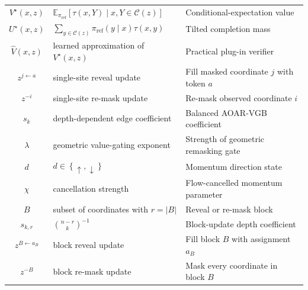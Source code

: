 \documentclass{article}
\numberwithin{theorem}{section}
\numberwithin{proposition}{section}
\numberwithin{corollary}{section}
\numberwithin{lemma}{section}
\numberwithin{conjecture}{section}
\numberwithin{remark}{section}
\numberwithin{definition}{section}
\numberwithin{assumption}{section}
\numberwithin{example}{section}
\newcommand{\calC}{{\mathcal{C}}}
\newcommand{\bbE}{\mathbb{E}}
\newcommand{\lbra}[1]{\left[#1\right]}
\newcommand{\mbra}[1]{\left\{#1\right\}}
\newcommand{\sbra}[1]{\left(#1\right)}
\begin{document}
\begin{table}[ht]
\begin{tabular}{c l l}
$V^\star\sbra{x,z}$
  & $\bbE_{\pi_{\mathrm{ref}}}\lbra{\tau\sbra{x,Y}\mid x,Y \in \calC\sbra{z}}$
  & Conditional-expectation value \\

$U^\star\sbra{x,z}$
  & $\sum_{y \in \calC\sbra{z}} \pi_{\mathrm{ref}}\sbra{y \mid x}\tau\sbra{x,y}$
  & Tilted completion mass \\

$\widehat V\sbra{x,z}$
  & learned approximation of $V^\star\sbra{x,z}$
  & Practical plug-in verifier \\

$z^{j \leftarrow a}$
  & single-site reveal update
  & Fill masked coordinate $j$ with token $a$ \\

$z^{-i}$
  & single-site re-mask update
  & Re-mask observed coordinate $i$ \\

$s_k$
  & depth-dependent edge coefficient
  & Balanced AOAR-VGB coefficient \\

$\lambda$
  & geometric value-gating exponent
  & Strength of geometric remasking gate \\

$d$
  & $d \in \mbra{\uparrow,\downarrow}$
  & Momentum direction state \\

$\chi$
  & cancellation strength
  & Flow-cancelled momentum parameter \\

\midrule

$B$
  & subset of coordinates with $r=|B|$
  & Reveal or re-mask block \\

$s_{k,r}$
  & $\binom{n-r}{k}^{-1}$
  & Block-update depth coefficient \\

$z^{B \leftarrow a_B}$
  & block reveal update
  & Fill block $B$ with assignment $a_B$ \\

$z^{-B}$
  & block re-mask update
  & Mask every coordinate in block $B$ \\

\bottomrule
\end{tabular}
\vspace{1mm}
\end{table}
\end{document}
